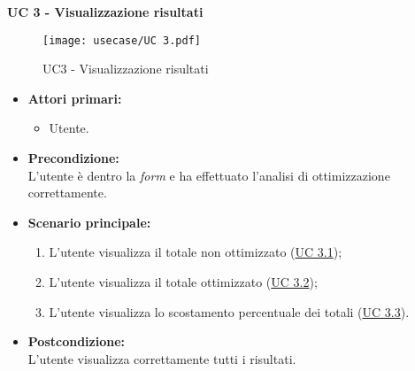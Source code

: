 \noindent \textbf{\large UC 3 - Visualizzazione risultati}
\label{uc:visualizzazione-risultati}
\begin{figure}[!h] 
    \centering 
    \texttt{[image: usecase/UC 3.pdf]} 
    \caption{UC3 - Visualizzazione risultati}
\end{figure}
\begin{itemize}

	\item \textbf{Attori primari: }
		\begin{itemize}
			\item Utente.
		\end{itemize}

	\item \textbf{Precondizione: }\\[0.3cm]
		L'utente è dentro la \textit{form} e ha effettuato l'analisi di ottimizzazione correttamente.

	\item \textbf{Scenario principale: }
		\begin{enumerate}
			\item L'utente visualizza il totale non ottimizzato (\hyperref[uc:visualizzazione-totale-non-ottimizzato]{UC 3.1});
			\item L'utente visualizza il totale ottimizzato (\hyperref[uc:visualizzazione-totale-ottimizzato]{UC 3.2});
			\item L'utente visualizza lo scostamento percentuale dei totali (\hyperref[uc:visualizzazione-scostamento-percentuale-totali]{UC 3.3}).
		\end{enumerate}
		

	\item \textbf{Postcondizione: }\\[0.3cm]
		L'utente visualizza correttamente tutti i risultati.

\end{itemize}

\vspace{0.4cm}

\newpage

